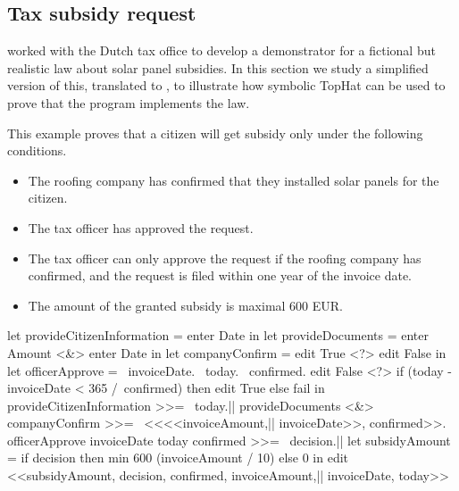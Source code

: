 \subsection{Tax subsidy request}

\citet{conf/sfp/StutterheimAP17} worked with the Dutch tax office to develop a demonstrator for a fictional but realistic law about solar panel subsidies.
In this section we study a simplified version of this, translated to \TOPHAT, to illustrate how symbolic TopHat can be used to prove that the program implements the law.

This example proves that a citizen will get subsidy only under the following conditions.
\begin{itemize}
\item The roofing company has confirmed that they installed solar panels for the citizen.
\item The tax officer has approved the request.
\item The tax officer can only approve the request if the roofing company has confirmed, and the request is filed within one year of the invoice date.
\item The amount of the granted subsidy is maximal 600 EUR.
\end{itemize}

\begin{TASK}[ float
            , floatplacement=b
            , escapechar=|
            , numbers=right
            , numbersep=-9pt %
            , caption=Subsidy request and approval workflow at the Dutch tax office.
            , label=fig:thetaxman
            ]
  let provideCitizenInformation = enter Date in
  let provideDocuments = enter Amount <&> enter Date in
  let companyConfirm = edit True <?> edit False in
  let officerApprove = \ invoiceDate. \ today. \ confirmed.
    edit False <?> if (today - invoiceDate < 365 /\ confirmed)
      then edit True else fail in
  provideCitizenInformation >>= \ today.|\label{fig:taxman-citizen-info}|
  provideDocuments <&> companyConfirm >>= \ <<<<invoiceAmount,|\label{fig:taxman-documents-and-company-confirm}|
    invoiceDate>>, confirmed>>.
  officerApprove invoiceDate today confirmed >>= \ decision.|\label{fig:taxman-officer-approve}|
  let subsidyAmount = if decision
    then min 600 (invoiceAmount / 10) else 0 in
  edit <<subsidyAmount, decision, confirmed, invoiceAmount,|\label{fig:taxman-result}|
    invoiceDate, today>>
\end{TASK}

